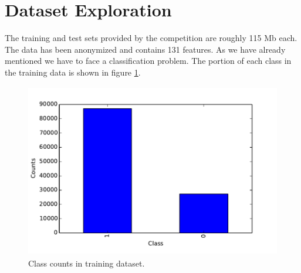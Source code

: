 \documentclass[conference, onecolumn]{IEEEtran}
\begin{document}
\section{Dataset Exploration}

The training and test sets provided by the competition are roughly 115 Mb each. The data has been anonymized and contains 131 features. As we have already mentioned we have to face a classification problem. The portion of each class in the training data is shown in figure \ref{fig_de1}.


\begin{figure}[ht]
\centering
\includegraphics[width=5in, height=3in]{plot_de1.pdf}
\caption{Class counts in training dataset.}
\label{fig_de1}
\end{figure}
\end{document}
